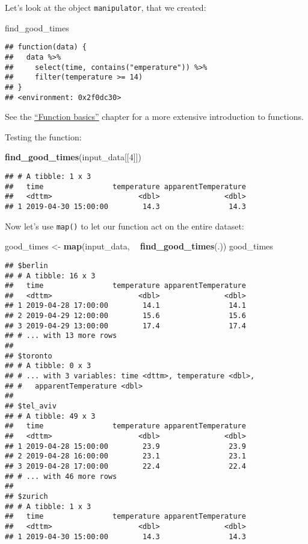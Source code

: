 \documentclass[]{book}
\newenvironment{Shaded}{\begin{snugshade}}{\end{snugshade}}
\newcommand{\DecValTok}[1]{\textcolor[rgb]{0.00,0.00,0.81}{#1}}
\newcommand{\KeywordTok}[1]{\textcolor[rgb]{0.13,0.29,0.53}{\textbf{#1}}}
\newcommand{\NormalTok}[1]{#1}
\newcommand{\OperatorTok}[1]{\textcolor[rgb]{0.81,0.36,0.00}{\textbf{#1}}}
\newcommand{\StringTok}[1]{\textcolor[rgb]{0.31,0.60,0.02}{#1}}
\begin{document}
Let's look at the object \texttt{manipulator}, that we created:

\begin{Shaded}
\begin{Highlighting}[]
\NormalTok{find_good_times}
\end{Highlighting}
\end{Shaded}

\begin{verbatim}
## function(data) {
##   data %>%
##     select(time, contains("emperature")) %>%
##     filter(temperature >= 14)
## }
## <environment: 0x2f0dc30>
\end{verbatim}

See the \protect\hyperlink{function-basics}{``Function basics''} chapter for a more extensive introduction to functions.

Testing the function:

\begin{Shaded}
\begin{Highlighting}[]
\KeywordTok{find_good_times}\NormalTok{(input_data[[}\DecValTok{4}\NormalTok{]])}
\end{Highlighting}
\end{Shaded}

\begin{verbatim}
## # A tibble: 1 x 3
##   time                temperature apparentTemperature
##   <dttm>                    <dbl>               <dbl>
## 1 2019-04-30 15:00:00        14.3                14.3
\end{verbatim}

Now let's use \texttt{map()} to let our function act on the entire dataset:

\begin{Shaded}
\begin{Highlighting}[]
\NormalTok{good_times <-}\StringTok{ }\KeywordTok{map}\NormalTok{(input_data, }\OperatorTok{~}\StringTok{ }\KeywordTok{find_good_times}\NormalTok{(.))}
\NormalTok{good_times}
\end{Highlighting}
\end{Shaded}

\begin{verbatim}
## $berlin
## # A tibble: 16 x 3
##   time                temperature apparentTemperature
##   <dttm>                    <dbl>               <dbl>
## 1 2019-04-28 17:00:00        14.1                14.1
## 2 2019-04-29 12:00:00        15.6                15.6
## 3 2019-04-29 13:00:00        17.4                17.4
## # ... with 13 more rows
## 
## $toronto
## # A tibble: 0 x 3
## # ... with 3 variables: time <dttm>, temperature <dbl>,
## #   apparentTemperature <dbl>
## 
## $tel_aviv
## # A tibble: 49 x 3
##   time                temperature apparentTemperature
##   <dttm>                    <dbl>               <dbl>
## 1 2019-04-28 15:00:00        23.9                23.9
## 2 2019-04-28 16:00:00        23.1                23.1
## 3 2019-04-28 17:00:00        22.4                22.4
## # ... with 46 more rows
## 
## $zurich
## # A tibble: 1 x 3
##   time                temperature apparentTemperature
##   <dttm>                    <dbl>               <dbl>
## 1 2019-04-30 15:00:00        14.3                14.3
\end{verbatim}
\end{document}

